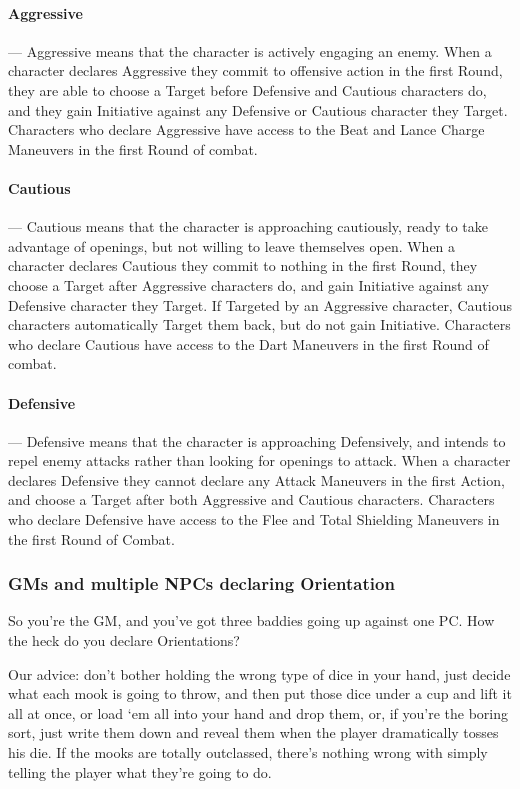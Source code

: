 \documentclass[oneside,11pt,english]{book}
\begin{document}
\paragraph{\label{par:Aggressive}Aggressive}---\quad
Aggressive means that the character is actively engaging an enemy. When a character declares
Aggressive they commit to offensive action in the first Round, they are able to choose a Target
before Defensive and Cautious characters do, and they gain Initiative against any Defensive or
Cautious character they Target. Characters who declare Aggressive have access to the Beat and
Lance Charge Maneuvers in the first Round of combat.
\paragraph{\label{par:Cautious}Cautious}---\quad
Cautious means that the character is approaching cautiously, ready to take advantage of openings,
but not willing to leave themselves open. When a character declares Cautious they commit to
nothing in the first Round, they choose a Target after Aggressive characters do, and gain Initiative
against any Defensive character they Target. If Targeted by an Aggressive character, Cautious
characters automatically Target them back, but do not gain Initiative. Characters who declare
Cautious have access to the Dart Maneuvers in the first Round of combat.
\paragraph{\label{par:Defensive}Defensive}---\quad
Defensive means that the character is approaching Defensively, and intends to repel enemy
attacks rather than looking for openings to attack. When a character declares Defensive they
cannot declare any Attack Maneuvers in the first Action, and choose a Target after both
Aggressive and Cautious characters. Characters who declare Defensive have access to the Flee
and Total Shielding Maneuvers in the first Round of Combat.
\subsubsection*{GMs and multiple NPCs declaring Orientation}
So you’re the GM, and you’ve got three baddies going up against one PC. How the heck do you declare
Orientations?

Our advice: don’t bother holding the wrong type of dice in your hand, just decide what each mook is
going to throw, and then put those dice under a cup and lift it all at once, or load ‘em all into your hand
and drop them, or, if you’re the boring sort, just write them down and reveal them when the player
dramatically tosses his die. If the mooks are totally outclassed, there’s nothing wrong with simply telling
the player what they’re going to do.
\end{document}
